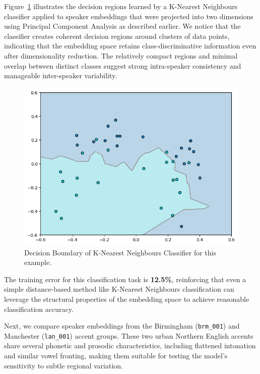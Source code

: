 \documentclass[conference]{IEEEtran}
\begin{document}
	Figure~\ref{fig:knn-shl-ilo} illustrates the decision regions learned by a K-Nearest Neighbours classifier applied to speaker embeddings that were projected into two dimensions using Principal Component Analysis as described earlier. We notice that the classifier creates coherent decision regions around clusters of data points, indicating that the embedding space retains class-discriminative information even after dimensionality reduction. The relatively compact regions and minimal overlap between distinct classes suggest strong intra-speaker consistency and manageable inter-speaker variability.
	
	\begin{figure}[H]
		\centering
		\includegraphics[width=1\linewidth]{img/img-knn-shl-ilo.png}
		\caption{Decision Boundary of K-Nearest Neighbours Classifier for this example.}
		\label{fig:knn-shl-ilo}
	\end{figure}
	
	The training error for this classification task is \textbf{12.5\%}, reinforcing that even a simple distance-based method like K-Nearest Neighbours classification can leverage the structural properties of the embedding space to achieve reasonable classification accuracy.
	
	\bigskip
	
	Next, we compare speaker embeddings from the Birmingham (\texttt{brm\_001}) and Manchester (\texttt{lan\_001}) accent groups. These two urban Northern English accents share several phonetic and prosodic characteristics, including flattened intonation and similar vowel fronting, making them suitable for testing the model's sensitivity to subtle regional variation. 
	
\end{document}
